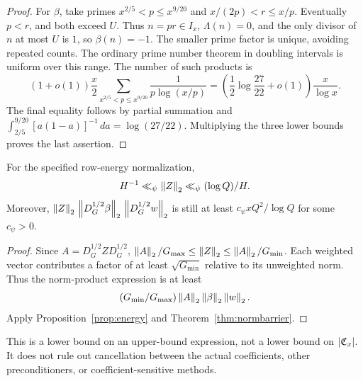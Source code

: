 \begin{proof}
For $\beta$, take primes $x^{2/5}<p\le x^{9/20}$ and $x/(2p)<r\le x/p$. Eventually $p<r$, and both exceed $U$. Thus $n=pr\in I_x$, $\Lambda(n)=0$, and the only divisor of $n$ at most $U$ is $1$, so $\beta(n)=-1$. The smaller prime factor is unique, avoiding repeated counts. The ordinary prime number theorem in doubling intervals is uniform over this range. The number of such products is
\[
(1+o(1))\frac x2\sum_{x^{2/5}<p\le x^{9/20}}\frac1{p\log(x/p)}
=\left(\frac12\log\frac{27}{22}+o(1)\right)\frac x{\log x}.
\]
The final equality follows by partial summation and
$\int_{2/5}^{9/20}[a(1-a)]^{-1}\,da=\log(27/22)$.
Multiplying the three lower bounds proves the last assertion.
\end{proof}

\begin{corollary}\label{cor:normalized}
For the specified row-energy normalization,
\[
H^{-1}\ll_\psi\left\|Z\right\|_2\ll_\psi(\log Q)/H.
\]
Moreover, $\left\|Z\right\|_2\,\left\|D_G^{1/2}\beta\right\|_2\,\left\|D_G^{1/2}w\right\|_2$ is still at least
$c_\psi xQ^2/\log Q$ for some $c_\psi>0$.
\end{corollary}
\begin{proof}
Since $A=D_G^{1/2}ZD_G^{1/2}$,
$\left\|A\right\|_2/G_{\max}\le\left\|Z\right\|_2\le\left\|A\right\|_2/G_{\min}$.
Each weighted vector contributes a factor of at least $\sqrt{G_{\min}}$ relative to its unweighted norm. Thus the norm-product expression is at least
\[
(G_{\min}/G_{\max})\left\|A\right\|_2\left\|\beta\right\|_2\left\|w\right\|_2.
\]
Apply Proposition~\ref{prop:energy} and Theorem~\ref{thm:normbarrier}.
\end{proof}
This is a lower bound on an upper-bound expression, not a lower bound on $|\mathfrak C_x|$. It does not rule out cancellation between the actual coefficients, other preconditioners, or coefficient-sensitive methods.

